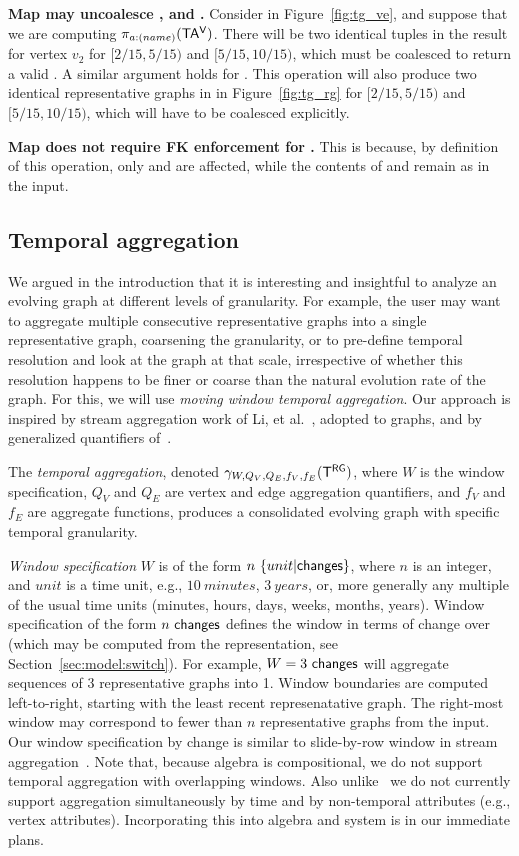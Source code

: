 {\bf Map may uncoalesce \tav, \tae and \trg.}  Consider  in
Figure~\ref{fig:tg_ve}, and suppose that we are computing
$\pi_{a:(name)} (\mathsf{TA^{V}})$.  There will be two identical tuples in the
result for vertex $v_2$ for $[2/15, 5/15)$ and $[5/15, 10/15)$, which
    must be coalesced to return a valid \tav.  A similar argument
    holds for \tae. This operation will also produce two identical
    representative graphs in \trg in Figure~\ref{fig:tg_rg} for $[2/15,
      5/15)$ and $[5/15, 10/15)$, which will have to be coalesced
        explicitly.

{\bf Map does not require FK enforcement for \tve.}  This is because,
by definition of this operation, only \tav and \tae are affected,
while the contents of \tv and \te remain as in the input.

\subsection{Temporal aggregation}
\label{sec:algebra:agg}

We argued in the introduction that it is interesting and insightful to
analyze an evolving graph at different levels of granularity.  For
example, the user may want to aggregate multiple consecutive
representative graphs into a single representative graph, coarsening
the granularity, or to pre-define temporal resolution and look at the
graph at that scale, irrespective of whether this resolution happens
to be finer or coarse than the natural evolution rate of the graph.
For this, we will use {\em moving window temporal aggregation}.  Our
approach is inspired by stream aggregation work of Li, et
al.~\cite{Li2005}, adopted to graphs, and by generalized quantifiers
of~\cite{Hsu1995}.

The {\em temporal aggregation}, denoted $\gamma_{W,Q_V,Q_E,f_V,f_E}
(\mathsf{T^{RG}})$, where $W$ is the window specification, $Q_V$ and $Q_E$ are
vertex and edge aggregation quantifiers, and $f_V$ and $f_E$ are
aggregate functions, produces a consolidated evolving graph with
specific temporal granularity.

{\em Window specification} $W$ is of the form
$n~\{unit|\textsf{changes}\}$, where $n$ is an integer, and $unit$ is a
time unit, e.g., $10~minutes$, $3~years$, or, more generally any
multiple of the usual time units (minutes, hours, days, weeks, months,
years).  Window specification of the form $n~\textsf{changes}$ defines
the window in terms of change over \trg (which may be computed from
the \tve representation, see Section~\ref{sec:model:switch}).  For
example, $W=3~\textsf{changes}$ will aggregate sequences of 3
representative graphs into 1.  Window boundaries are computed
left-to-right, starting with the least recent represenatative graph.
The right-most window may correspond to fewer than $n$ representative
graphs from the input.
%
Our window specification by change is similar to slide-by-row window
in stream aggregation~\cite{Li2005}.  Note that, because \tg algebra
is compositional, we do not support temporal aggregation with
overlapping windows. Also unlike~\cite{Li2005} we do not currently
support aggregation simultaneously by time and by non-temporal
attributes (e.g., vertex attributes). Incorporating this into \tg
algebra and \ql system is in our immediate plans.

